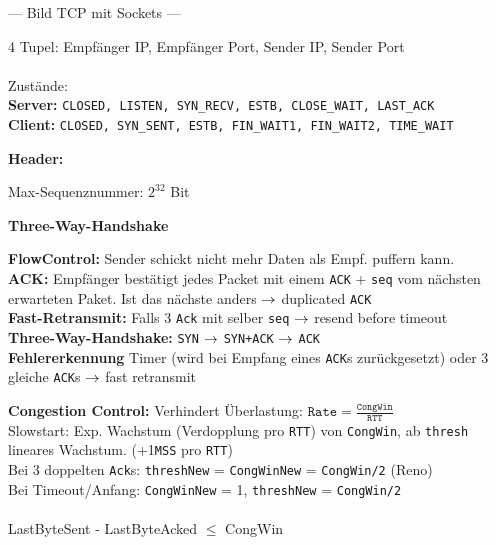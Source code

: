 \documentclass[fs, footer]{latex4ei}
\begin{document}
\begin{multicols*}{4}
{	--- Bild TCP mit Sockets ---

	4 Tupel:  Empfänger IP, Empfänger Port, Sender IP, Sender Port\\
	\\
	Zustände:\\
	\textbf{Server:} \texttt{CLOSED, LISTEN, SYN\_RECV, ESTB, CLOSE\_WAIT, LAST\_ACK}\\
	\textbf{Client:} \texttt{CLOSED, SYN\_SENT, ESTB, FIN\_WAIT1, FIN\_WAIT2, TIME\_WAIT}

	\textbf{Header:}

	Max-Sequenznummer: $2^{32}$ Bit

	\textbf{Three-Way-Handshake}

	\textbf{FlowControl:} Sender schickt nicht mehr Daten als Empf. puffern kann.\\
	\textbf{ACK:} Empfänger bestätigt jedes Packet mit einem \texttt{ACK} + \texttt{seq} vom nächsten erwarteten Paket. Ist das nächste anders $\rightarrow$ duplicated \texttt{ACK}\\
	\textbf{Fast-Retransmit:} Falls 3 \texttt{Ack} mit selber \texttt{seq} $\rightarrow$ resend before timeout\\
	\textbf{Three-Way-Handshake:} \texttt{SYN} $\rightarrow$ \texttt{SYN+ACK} $\rightarrow$ \texttt{ACK}\\

	\textbf{Fehlererkennung} Timer (wird bei Empfang eines \texttt{ACK}s zurückgesetzt) oder 3 gleiche \texttt{ACK}s $\rightarrow$ fast retransmit

	\textbf{Congestion Control:} Verhindert Überlastung: $\texttt{Rate} = \frac{\texttt{CongWin}}{\texttt{RTT}}$\\
	Slowstart: Exp. Wachstum (Verdopplung pro \texttt{RTT}) von \texttt{CongWin}, ab \texttt{thresh} lineares Wachstum. (+1\texttt{MSS} pro \texttt{RTT}) \\
	Bei 3 doppelten \texttt{Ack}s: \texttt{threshNew} = \texttt{CongWinNew} = \texttt{CongWin/2} (Reno)\\
	Bei Timeout/Anfang: \texttt{CongWinNew} = 1, \qquad \texttt{threshNew} = \texttt{CongWin/2}\\
	\\
	LastByteSent - LastByteAcked $\le$ CongWin

	}
\end{multicols*}
\end{document}
